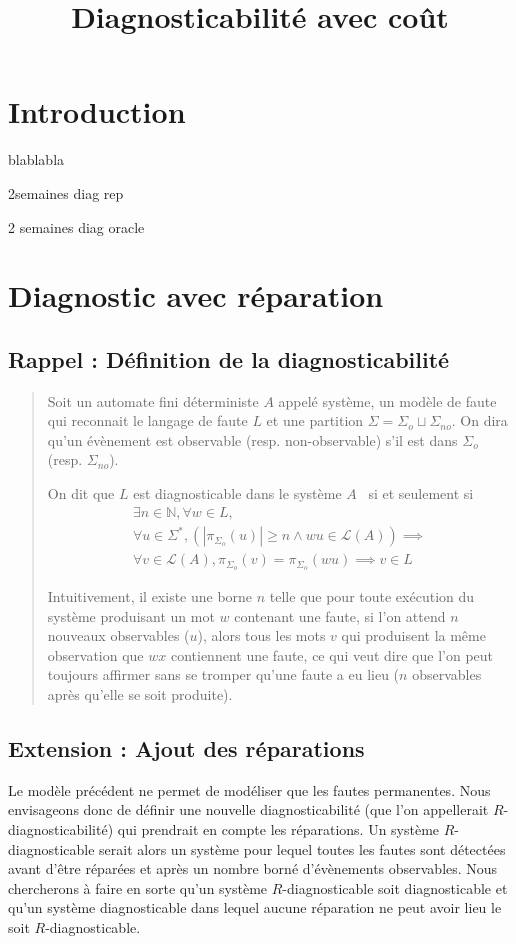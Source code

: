 \documentclass[a4paper,10pt]{article}
\title{Diagnosticabilit\'e avec co\^ut}
\begin{document}
\section*{Introduction}

blablabla

2semaines diag rep

2 semaines diag oracle

\section{Diagnostic avec r\'eparation}
\subsection{Rappel : Définition de la diagnosticabilité}
\begin{quote}
Soit un automate fini d\'eterministe $A$ appel\'e syst\`eme, un modèle de faute qui reconnait le langage de faute $L$ et une partition $\Sigma=\Sigma_o\sqcup \Sigma_{no}$. On dira qu'un \'ev\`enement est observable (resp. non-observable) s'il est dans $\Sigma_o$ (resp. $\Sigma_{no}$).

On dit que $L$ est diagnosticable dans le système $A$~\cite{SamSRST96}  si et seulement si $$\begin{array}{l}
\exists n \in \mathbb N, \forall w \in L,\\
\forall u \in \Sigma^*, \left(\left|\pi_{\Sigma_o}(u)\right|\ge n \land wu \in \mathcal L(A)\right) \implies\\
\forall v \in \mathcal L(A), \pi_{\Sigma_o}(v)=\pi_{\Sigma_o}(wu) \implies v \in L
\end{array}$$

Intuitivement, il existe une borne $n$ telle que pour toute ex\'ecution du système produisant un mot $w$ contenant une faute, si l'on attend $n$ nouveaux observables ($u$), alors tous les mots $v$ qui produisent la m\^eme observation que $wx$ contiennent une faute, ce qui veut dire que l'on peut toujours affirmer sans se tromper qu'une faute a eu lieu ($n$ observables après qu'elle se soit produite).
\end{quote}

\subsection{Extension : Ajout des r\'eparations}

Le mod\`ele pr\'ec\'edent ne permet de mod\'eliser que les fautes permanentes. Nous envisageons donc de d\'efinir une nouvelle diagnosticabilit\'e (que l'on appellerait $R$-diagnosticabilit\'e) qui prendrait en compte les r\'eparations. Un syst\`eme $R$-diagnosticable serait alors un syst\`eme pour lequel toutes les fautes sont d\'etect\'ees avant d'\^etre r\'epar\'ees et apr\`es un nombre born\'e d'\'ev\`enements observables. Nous chercherons \`a faire en sorte qu'un syst\`eme $R$-diagnosticable soit diagnosticable et qu'un syst\`eme diagnosticable dans lequel aucune r\'eparation ne peut avoir lieu le soit $R$-diagnosticable.
\end{document}
